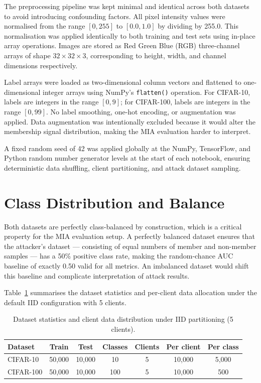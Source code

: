 \documentclass[12pt, a4paper]{report}
\begin{document}
The preprocessing pipeline was kept minimal and identical across both datasets to
avoid introducing confounding factors. All pixel intensity values were normalised
from the range $[0, 255]$ to $[0.0, 1.0]$ by dividing by 255.0. This
normalisation was applied identically to both training and test sets using
in-place array operations. Images are stored as Red Green Blue (RGB) three-channel
arrays of shape $32 \times 32 \times 3$, corresponding to height, width, and
channel dimensions respectively.

Label arrays were loaded as two-dimensional column vectors and flattened to
one-dimensional integer arrays using NumPy's \texttt{flatten()} operation. For
CIFAR-10, labels are integers in the range $[0, 9]$; for CIFAR-100, labels are
integers in the range $[0, 99]$. No label smoothing, one-hot encoding, or
augmentation was applied. Data augmentation was intentionally excluded because
it would alter the membership signal distribution, making the MIA evaluation
harder to interpret.

A fixed random seed of 42 was applied globally at the NumPy, TensorFlow, and
Python random number generator levels at the start of each notebook, ensuring
deterministic data shuffling, client partitioning, and attack dataset sampling.

\section{Class Distribution and Balance}

Both datasets are perfectly class-balanced by construction, which is a critical
property for the MIA evaluation setup. A perfectly balanced dataset ensures that
the attacker's dataset --- consisting of equal numbers of member and non-member
samples --- has a 50\% positive class rate, making the random-chance AUC baseline
of exactly 0.50 valid for all metrics. An imbalanced dataset would shift this
baseline and complicate interpretation of attack results.

Table~\ref{tab:data_distribution} summarises the dataset statistics and per-client
data allocation under the default IID configuration with 5 clients.

\begin{table}[H]
  \centering
  \caption{Dataset statistics and client data distribution under IID partitioning (5 clients).}
  \label{tab:data_distribution}
  \begin{tabular}{lcccccc}
    \toprule
    \textbf{Dataset} & \textbf{Train} & \textbf{Test} & \textbf{Classes} & \textbf{Clients} & \textbf{Per client} & \textbf{Per class} \\
    \midrule
    CIFAR-10  & 50,000 & 10,000 & 10  & 5 & 10,000 & 5,000 \\
    CIFAR-100 & 50,000 & 10,000 & 100 & 5 & 10,000 & 500   \\
    \bottomrule
  \end{tabular}
\end{table}
\end{document}
